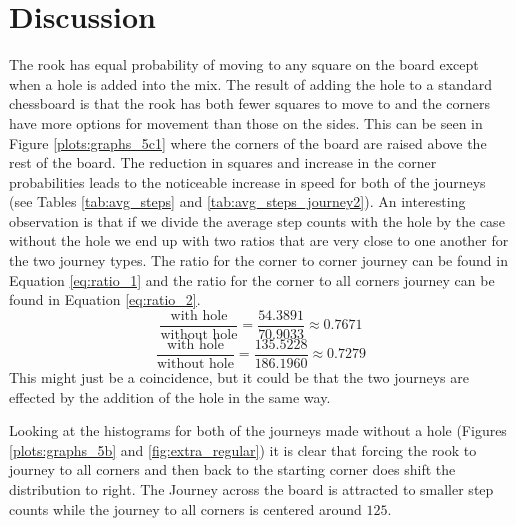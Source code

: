\documentclass{amsart}
\numberwithin{equation}{section}
\begin{document}


\section{Discussion}
The rook has equal probability of moving to any square on the board except when a hole is added into the mix. The result of adding the hole to a standard chessboard is that the rook has both fewer squares to move to and the corners have more options for movement than those on the sides. This can be seen in Figure \ref{plots:graphs_5c1} where the corners of the board are raised above the rest of the board. The reduction in squares and increase in the corner probabilities leads to the noticeable increase in speed for both of the journeys (see Tables \ref{tab:avg_steps} and \ref{tab:avg_steps_journey2}). An interesting observation is that if we divide the average step counts with the hole by the case without the hole we end up with two ratios that are very close to one another for the two journey types. The ratio for the corner to corner journey can be found in Equation \ref{eq:ratio_1} and the ratio for the corner to all corners journey can be found in Equation \ref{eq:ratio_2}.
\begin{equation}
    \label{eq:ratio_1}
    \frac{\text{with hole}}{\text{without hole}}=\frac{54.3891}{70.9033}\approx0.7671
\end{equation}
\begin{equation}
    \label{eq:ratio_2}
    \frac{\text{with hole}}{\text{without hole}}=\frac{135.5228}{186.1960}\approx0.7279
\end{equation}
This might just be a coincidence, but it could be that the two journeys are effected by the addition of the hole in the same way. \par
Looking at the histograms for both of the journeys made without a hole (Figures \ref{plots:graphs_5b} and \ref{fig:extra_regular}) it is clear that forcing the rook to journey to all corners and then back to the starting corner does shift the distribution to right. The Journey across the board is attracted to smaller step counts while the journey to all corners is centered around $125$. \par
\end{document}
